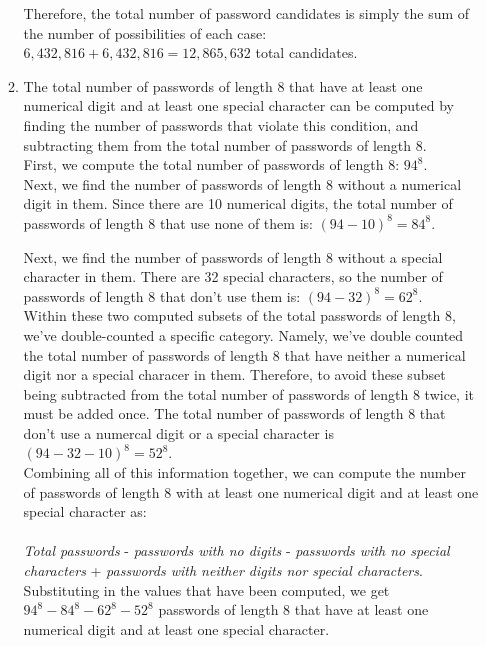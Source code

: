 \documentclass[11pt]{article}
\theoremstyle{definition}
\begin{document}
\begin{enumerate}
\begin{enumerate}
Therefore, the total number of password candidates is simply the sum of the number of possibilities of each case: $6,432,816 + 6,432,816 = 12,865,632$ total candidates.\\

\item The total number of passwords of length 8 that have at least one numerical digit and at least one special character can be computed by finding the number of passwords that
violate this condition, and subtracting them from the total number of passwords of length 8.\\ 

First, we compute the total number of passwords of length 8: $94^8$.\\

Next, we find the number of passwords of length 8 without a numerical digit in them. Since there are 10 numerical digits, the total number of passwords of length 8 that use none of them is:
$(94-10)^8 = 84^8$.

Next, we find the number of passwords of length 8 without a special character in them. There are 32 special characters, so the number of passwords of length 8 
that don't use them is: $(94-32)^8 = 62^8$.\\

Within these two computed subsets of the total passwords of length 8, we've double-counted a specific category. 
Namely, we've double counted the total number of passwords of length 8 that have neither a numerical digit nor a special characer in them. 
Therefore, to avoid these subset being subtracted from the total number of passwords of length 8 twice, it must be added once. The total number of passwords of 
length 8 that don't use a numercal digit or a special character is $(94 - 32 - 10)^8 = 52^8$.\\ 

Combining all of this information together, we can compute the number of passwords of length 8 with at least one numerical digit and at least one special character as:\\ \\
\textit{Total passwords} - \textit{passwords with no digits} - \textit{passwords with no special characters} + \textit{passwords with neither digits nor special characters}.\\

Substituting in the values that have been computed, we get $94^8 - 84^8 - 62^8 - 52^8$ passwords of length 8 that have at least one numerical digit and at least one special character.\\


\end{enumerate}
\end{enumerate}
\end{document}
